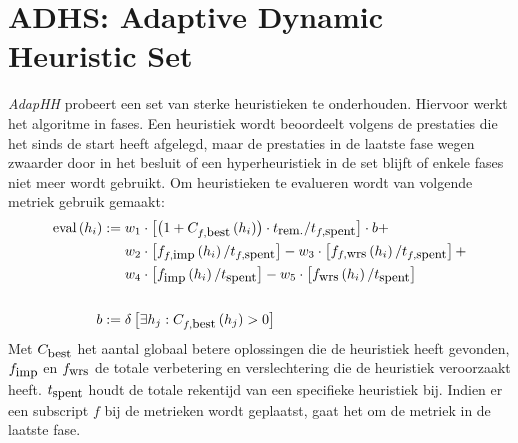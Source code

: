 \section{ADHS: Adaptive Dynamic Heuristic Set}
\emph{AdapHH} probeert een set van sterke heuristieken te onderhouden. Hiervoor werkt het algoritme in fases. Een heuristiek wordt beoordeelt volgens de prestaties die het sinds de start heeft afgelegd, maar de prestaties in de laatste fase wegen zwaarder door in het besluit of een hyperheuristiek in de set blijft of enkele fases niet meer wordt gebruikt. Om heuristieken te evalueren wordt van volgende metriek gebruik gemaakt:
\begin{align*}
\mbox{eval}\left(h_i\right):={}&w_1\cdot\left[\left(1+C_{f,\mbox{\small{best}}}\left(h_i\right)\right)\cdot t_{\mbox{\small{rem.}}}/t_{f,\mbox{\small{spent}}}\right]\cdot b+\\
&w_2\cdot\left[f_{f,\mbox{\small{imp}}}\left(h_i\right)/t_{f,\mbox{\small{spent}}}\right]-w_3\cdot\left[f_{f,\mbox{\small{wrs}}}\left(h_i\right)/t_{f,\mbox{\small{spent}}}\right]+\\
&w_4\cdot\left[f_{\mbox{\small{imp}}}\left(h_i\right)/t_{\mbox{\small{spent}}}\right]-w_5\cdot\left[f_{\mbox{\small{wrs}}}\left(h_i\right)/t_{\mbox{\small{spent}}}\right]\\\\
b:={}&\delta\left[\exists h_j:C_{f,\mbox{\small{best}}}\left(h_j\right)>0\right]
\end{align*}
Met $C_{\mbox{\small{best}}}$ het aantal globaal betere oplossingen die de heuristiek heeft gevonden, $f_{\mbox{\small{imp}}}$ en $f_{\mbox{\small{wrs}}}$ de totale verbetering en verslechtering die de heuristiek veroorzaakt heeft. $t_{\mbox{\small{spent}}}$ houdt de totale rekentijd van een specifieke heuristiek bij. Indien er een subscript $f$ bij de metrieken wordt geplaatst, gaat het om de metriek in de laatste fase.

